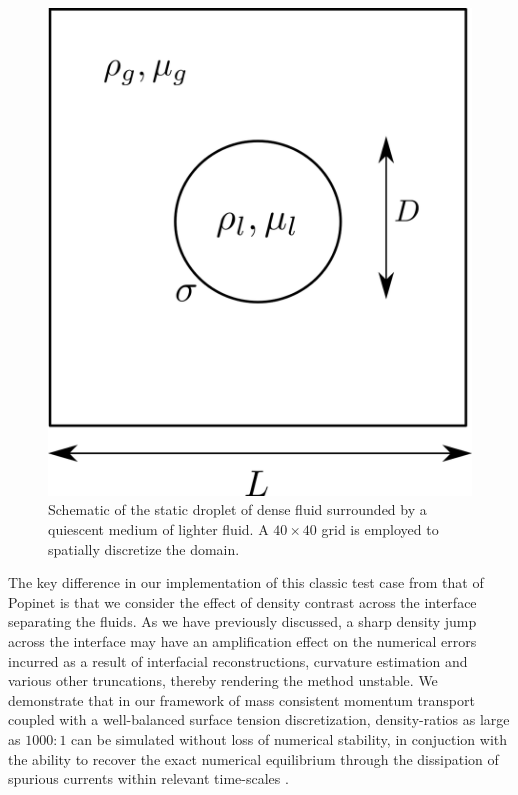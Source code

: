 \begin{figure}[h!]
    \centering
    \includegraphics[width = 1.0\textwidth]{plots/static_drop/config.png}
    \caption{Schematic of the static droplet of dense fluid surrounded by a quiescent medium of lighter fluid. A $40 \times 40$ grid is employed to spatially discretize the domain.}
    \label{static_conf}
\end{figure}

The key difference in our implementation of this classic test case from that of Popinet  is that we consider the effect of density contrast across the interface separating the fluids. As we have previously discussed, a sharp density jump across the interface may have an amplification effect on the numerical errors incurred as a result of interfacial reconstructions, curvature estimation and various other truncations, thereby rendering the method unstable. We demonstrate that in our framework of mass consistent momentum transport coupled with a well-balanced surface tension discretization, density-ratios as large as $1000:1$ can be simulated without loss of numerical stability, in conjuction with the ability to recover the exact numerical equilibrium through the dissipation of spurious currents within relevant time-scales .

